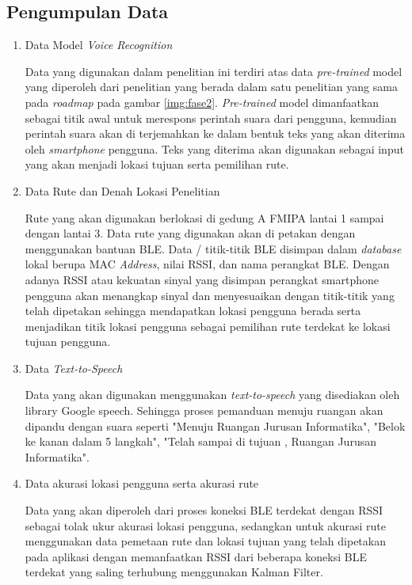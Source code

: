 \subsection{Pengumpulan Data}
\begin{enumerate}
\item Data Model \textit{Voice Recognition}
\par Data yang digunakan dalam penelitian ini terdiri atas data \textit{pre-trained} model yang diperoleh dari penelitian yang berada dalam satu penelitian yang sama pada \textit{roadmap} pada gambar \ref{img:fase2}. \textit{Pre-trained} model dimanfaatkan sebagai titik awal untuk merespons perintah suara dari pengguna, kemudian perintah suara akan di terjemahkan ke dalam bentuk teks yang akan diterima oleh \textit{smartphone} pengguna. Teks yang diterima akan digunakan sebagai input yang akan menjadi lokasi tujuan serta pemilihan rute.

\item Data Rute dan Denah Lokasi Penelitian
\par Rute yang akan digunakan berlokasi di gedung A FMIPA lantai 1 sampai dengan lantai 3. Data rute yang digunakan akan di petakan dengan menggunakan bantuan BLE. Data / titik-titik BLE disimpan dalam \textit{database} lokal berupa MAC \textit{Address}, nilai RSSI, dan nama perangkat BLE. Dengan adanya RSSI atau kekuatan sinyal yang disimpan perangkat smartphone pengguna akan menangkap sinyal dan menyesuaikan dengan titik-titik yang telah dipetakan sehingga mendapatkan lokasi pengguna berada serta menjadikan titik lokasi pengguna sebagai pemilihan rute terdekat ke lokasi tujuan pengguna.

\item Data \textit{Text-to-Speech}
\par Data yang akan digunakan menggunakan \textit{text-to-speech} yang disediakan oleh library Google speech. Sehingga proses pemanduan menuju ruangan akan dipandu dengan suara seperti "Menuju Ruangan Jurusan Informatika", "Belok ke kanan dalam 5 langkah", "Telah sampai di tujuan , Ruangan Jurusan Informatika".

\item Data akurasi lokasi pengguna serta akurasi rute
\par Data yang akan diperoleh dari proses koneksi BLE terdekat dengan RSSI sebagai tolak ukur akurasi lokasi pengguna, sedangkan untuk akurasi rute menggunakan data pemetaan rute dan lokasi tujuan yang telah dipetakan pada aplikasi dengan memanfaatkan RSSI dari beberapa koneksi BLE terdekat yang saling terhubung menggunakan Kalman Filter.

\end{enumerate}

